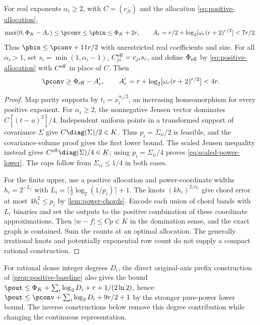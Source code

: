 \begin{proposition}\label{prop:pure-power-finite}
For real exponents $\alpha_i\ge2$, with $C=(c_{ji})$ and the
allocation \eqref{eq:positive-allocation},
\begin{equation}\label{eq:pure-power-finite}
 \max(0,\Phi_K-A_r)\le\pconv\le\pbin\le\Phi_K+2r,
 \qquad A_r=r/2+\log_2[\omega_r(r+2)^{r/2}]<7r/2.
\end{equation}
Thus $\pbin\le\pconv+11r/2$ with unrestricted real coefficients
and size. For all $\alpha_i>1$, set $s_i=\min(1,\alpha_i-1)$,
$C^{\rm eff}_{ji}=c_{ji}s_i$, and define $\Phi_{\rm eff}$ by
\eqref{eq:positive-allocation} with $C^{\rm eff}$ in place of $C$.
Then
\begin{equation}\label{eq:scaled-power-lower}
 \pconv\ge\Phi_{\rm eff}-A_r',
 \qquad A_r'=r+\log_2[\omega_r(r+2)^{r/2}]<4r.
\end{equation}
\end{proposition}
\begin{proof}
Map parity supports by $t_i=x_i^{\alpha_i/2}$, an increasing
homeomorphism for every positive exponent. For $\alpha_i\ge2$, the
nonnegative Jensen vector dominates $C[(t-u)^2]/4$. Independent
uniform points in a transformed support of covariance $\Sigma$ give
$C\diag(\Sigma)/2\in K$. Thus $p_i=\Sigma_{ii}/2$ is feasible,
and the covariance-volume proof gives the first lower bound. The
scaled Jensen inequality instead gives
$C^{\rm eff}\diag(\Sigma)/4\in K$; using
$p_i=\Sigma_{ii}/4$ proves \eqref{eq:scaled-power-lower}.
The caps follow from $\Sigma_{ii}\le1/4$ in both cases.

For the finite upper, use a positive allocation and power-coordinate
widths $h_i=2^{-L_i}$ with
$L_i=\lceil\frac12\log_2(1/p_i)\rceil+1$.
The knots $(kh_i)^{2/\alpha_i}$ give chord error at most
$4h_i^2\le p_i$ by \cref{lem:power-chords}. Encode each union of
chord bands with $L_i$ binaries and set the outputs to the positive
combination of these coordinate approximations. Then
$|w-f|\le Cp\in K$ in the domination sense, and the exact graph is
contained. Sum the counts at an optimal allocation. The generally
irrational knots and potentially exponential row count do not supply
a compact rational construction.
\end{proof}

For rational dense integer degrees $D_i$, the direct original-axis
prefix construction of \cref{prop:positive-baseline} also gives the bound
$\pout\le\Phi_K+\sum_i\log_2D_i+r+1/(2\ln2)$, hence
$\pout\le\pconv+\sum_i\log_2D_i+9r/2+1$ by the stronger
pure-power lower bound. The inverse constructions below remove this
degree contribution while changing the continuous representation.

